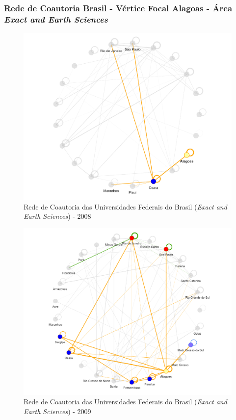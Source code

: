 \subsubsection{Rede de Coautoria Brasil - Vértice Focal Alagoas - Área \textit{Exact and Earth Sciences}}

\begin{figure}[H]
	\centering
	\includegraphics[scale=0.6]{Imagens/rede-exact-AL-2008.pdf}
	\caption{Rede de Coautoria das Universidades Federais do Brasil (\textit{Exact and Earth Sciences}) - 2008}
	\label{Rede de Coautoria - UF EXACT AL 2008}
\end{figure}

\begin{figure}[H]
	\centering
	\includegraphics[scale=0.6]{Imagens/rede-exact-AL-2009.pdf}
	\caption{Rede de Coautoria das Universidades Federais do Brasil (\textit{Exact and Earth Sciences}) - 2009}
	\label{Rede de Coautoria - UF EXACT AL 2009}
\end{figure}

